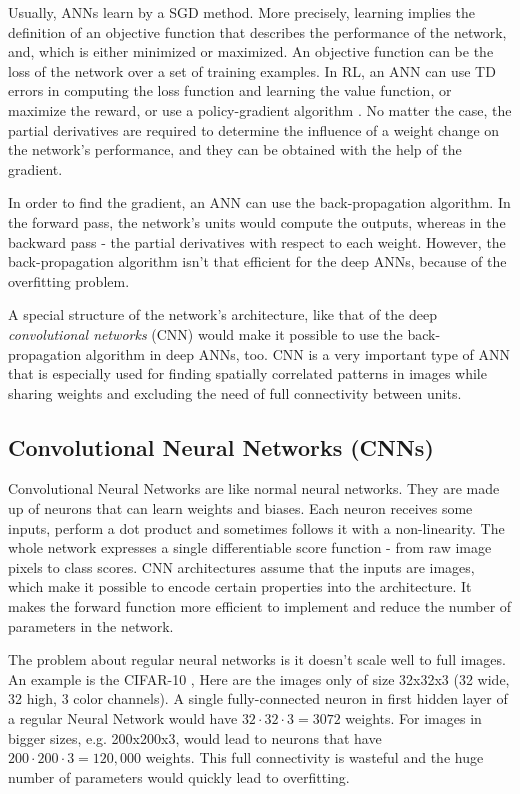 Usually, ANNs learn by a SGD method. More precisely, learning implies the definition of an objective function that describes the performance of the network, and, which is either minimized or maximized. An objective function can be the loss of the network over a set of training examples. In RL, an ANN can use TD errors in computing the loss function and learning the value function, or maximize the reward, or use a policy-gradient algorithm \cite{Sutton}. No matter the case, the partial derivatives are required to determine the influence of a weight change on the network's performance, and they can be obtained with the help of the gradient.

In order to find the gradient, an ANN can use the back-propagation algorithm. In the forward pass, the network's units would compute the outputs, whereas in the backward pass - the partial derivatives with respect to each weight. However, the back-propagation algorithm isn't that efficient for the deep ANNs, because of the overfitting problem.

A special structure of the network's architecture, like that of the deep \textit{convolutional networks} (CNN) would make it possible to use the back-propagation algorithm in deep ANNs, too. CNN is a very important type of ANN that is especially used for finding spatially correlated patterns in images while sharing weights and excluding the need of full connectivity between units.

\subsection{Convolutional Neural Networks (CNNs)} \label{subsectionCNN}

Convolutional Neural Networks are like normal neural networks. They are made up of neurons that can learn weights and biases. Each neuron receives some inputs, perform a dot product and sometimes follows it with a non-linearity. The whole network expresses a single differentiable score function - from raw image pixels to class scores. CNN architectures assume that the inputs are images, which make it possible to encode certain properties into the architecture. It makes the forward function more efficient to implement and reduce the number of parameters in the network. \cite{CNN_course}           

The problem about regular neural networks is it doesn't scale well to full images. An example is the CIFAR-10 \cite{CIFAR_10}, Here are the images only of size 32x32x3 (32 wide, 32 high, 3 color channels). A single fully-connected neuron in first hidden layer of a regular Neural Network would have $32\cdot32\cdot3 = 3072$ weights. For images in bigger sizes, e.g. 200x200x3, would lead to neurons that have $200\cdot200\cdot3 = 120,000$ weights. This full connectivity is wasteful and the huge number of parameters would quickly lead to overfitting.

